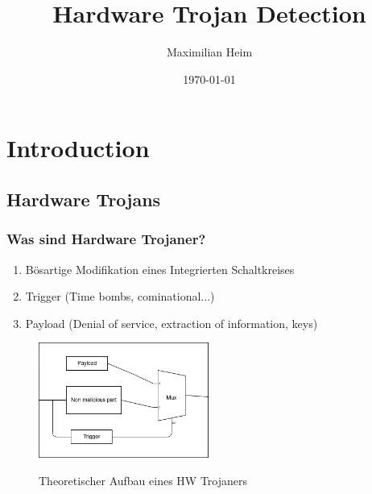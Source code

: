 \documentclass[11pt]{beamer}
\author{Maximilian Heim}
\title{Hardware Trojan Detection}
\institute{University Albstadt-Sigmaringen}
\date{\today}
\begin{document}
\begin{frame}
\titlepage
\end{frame}

\begin{frame}
\tableofcontents
\end{frame}

\section{Introduction}
\subsection{Hardware Trojans}
\begin{frame}
    \frametitle{Was sind Hardware Trojaner?}
    \begin{enumerate}
    \item Bösartige Modifikation eines Integrierten Schaltkreises
    \item Trigger (Time bombs, cominational...)
    \item Payload (Denial of service, extraction of information, keys)
    \end{enumerate}
    \begin{figure}
        \caption{Theoretischer Aufbau eines HW Trojaners}
        \includegraphics[width=0.5\textwidth]{triggerpayload.png}
        \label{trpl}
    \end{figure}
\end{frame}
\end{document}
